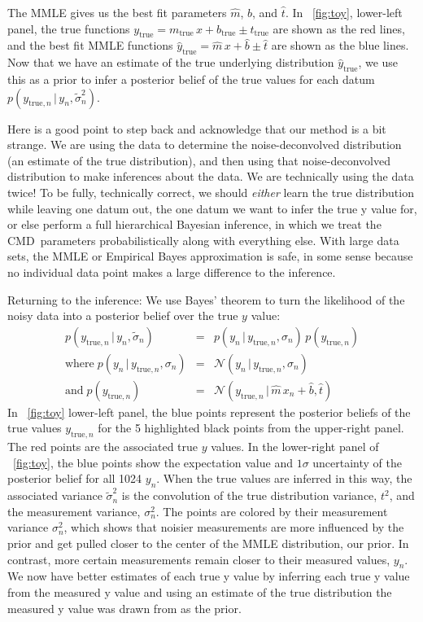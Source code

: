 \documentclass[modern]{aastex61}
\newcommand{\acronym}[1]{{\small{#1}}}
\newcommand{\cmd}{\acronym{CMD}}
\newcommand{\given}{\,|\,}
\newcommand{\true}{\mathrm{true}}
\begin{document}
The MMLE gives us the best fit parameters $\hat{m}$, $\hat{b}$, and $\hat{t}$. In \figurename~\ref{fig:toy}, lower-left panel, the true functions $y_{\true} = m_{\true}\,x + b_{\true} \pm t_{\true}$ are shown as the red lines, and the best fit MMLE functions $\hat{y}_{\true} = \hat{m}\, x + \hat{b} \pm \hat{t}$ are shown as the blue lines. Now that we have an estimate of the true underlying distribution $\hat{y}_{\true}$, we use this as a prior to infer a posterior belief of the true values for each datum $p(y_{\true,n} \given y_n, \tilde{\sigma}_n^2)$.

Here is a good point to step back and acknowledge that our method is a
bit strange. We are using the data to determine the
noise-deconvolved distribution (an estimate of the true
distribution), and then using that noise-deconvolved distribution to
make inferences about the data. We are technically using the data
twice! To be fully, technically correct, we should \emph{either} learn the true
distribution while leaving one datum out, the one datum we want to
infer the true y value for, or else perform a full hierarchical Bayesian inference,
in which we treat the \cmd\ parameters probabilistically along with everything else.
With large data sets, the MMLE or Empirical Bayes approximation is safe,
in some sense because no individual data point makes a large difference to
the inference.

Returning to the inference:
We use Bayes' theorem to turn the likelihood of the noisy data into a posterior belief over the true $y$ value:
\begin{eqnarray}
p(y_{\true,n} \given y_n, \tilde{\sigma}_n) &=& p(y_n \given y_{\true,n}, \sigma_n)\,p(y_{\true,n}) \\
\mathrm{where}\;p(y_n \given y_{\true,n}, \sigma_n) &=& \mathcal{N}(y_n \given y_{\true,n}, \sigma_n) \\
\mathrm{and}\;p(y_{\true,n}) &=& \mathcal{N}(y_{\true,n} \given \hat{m}\, x_n + \hat{b}, \hat{t})
\label{eq:toyBayes}
\end{eqnarray}
In \figurename~\ref{fig:toy} lower-left panel, the blue points represent the posterior beliefs of the true values $y_{\true,n}$ for the 5 highlighted black points from the upper-right panel. The red points are the associated true $y$ values.
In the lower-right panel of \figurename~\ref{fig:toy}, the blue points show the expectation value and $1\sigma$ uncertainty of the posterior belief for all 1024 $y_n$.
When the true values are inferred in this way, the associated variance $\tilde{\sigma}_n^2$ is the convolution of the true distribution variance, $t^2$, and the measurement variance, $\sigma_n^2$.
The points are colored by their measurement variance $\sigma_n^2$, which shows that noisier measurements are more influenced by the prior and get pulled closer to the center of the MMLE distribution, our prior. In contrast, more certain measurements remain closer to their measured values, $y_n$. We now have better estimates of each true y value by inferring each true y value from the measured y value and using an estimate of the true distribution the measured y value was drawn from as the prior.
\end{document}
